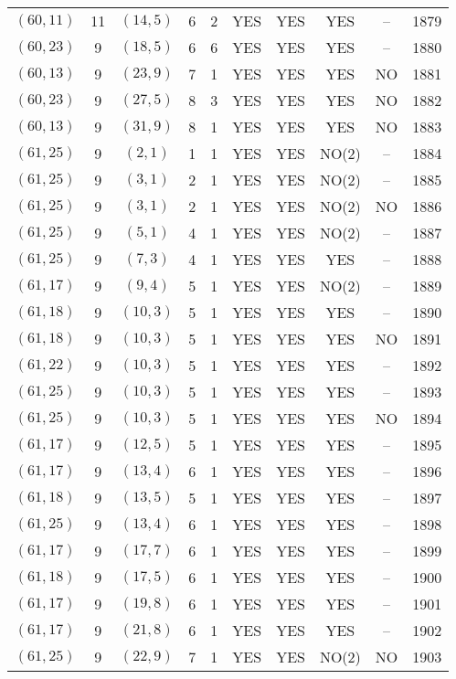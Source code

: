 \begin{longtable}{|c|c|c|c|c|c|c|c|c|c|}
$(60, 11)$ & 11 & $(14, 5)$ & 6 & 2 & YES & YES & YES & -- & 1879\\
$(60, 23)$ & 9 & $(18, 5)$ & 6 & 6 & YES & YES & YES & -- & 1880\\
$(60, 13)$ & 9 & $(23, 9)$ & 7 & 1 & YES & YES & YES & NO & 1881\\
$(60, 23)$ & 9 & $(27, 5)$ & 8 & 3 & YES & YES & YES & NO & 1882\\
$(60, 13)$ & 9 & $(31, 9)$ & 8 & 1 & YES & YES & YES & NO & 1883\\
$(61, 25)$ & 9 & $(2, 1)$ & 1 & 1 & YES & YES & NO(2) & -- & 1884\\
$(61, 25)$ & 9 & $(3, 1)$ & 2 & 1 & YES & YES & NO(2) & -- & 1885\\
$(61, 25)$ & 9 & $(3, 1)$ & 2 & 1 & YES & YES & NO(2) & NO & 1886\\
$(61, 25)$ & 9 & $(5, 1)$ & 4 & 1 & YES & YES & NO(2) & -- & 1887\\
$(61, 25)$ & 9 & $(7, 3)$ & 4 & 1 & YES & YES & YES & -- & 1888\\
$(61, 17)$ & 9 & $(9, 4)$ & 5 & 1 & YES & YES & NO(2) & -- & 1889\\
$(61, 18)$ & 9 & $(10, 3)$ & 5 & 1 & YES & YES & YES & -- & 1890\\
$(61, 18)$ & 9 & $(10, 3)$ & 5 & 1 & YES & YES & YES & NO & 1891\\
$(61, 22)$ & 9 & $(10, 3)$ & 5 & 1 & YES & YES & YES & -- & 1892\\
$(61, 25)$ & 9 & $(10, 3)$ & 5 & 1 & YES & YES & YES & -- & 1893\\
$(61, 25)$ & 9 & $(10, 3)$ & 5 & 1 & YES & YES & YES & NO & 1894\\
$(61, 17)$ & 9 & $(12, 5)$ & 5 & 1 & YES & YES & YES & -- & 1895\\
$(61, 17)$ & 9 & $(13, 4)$ & 6 & 1 & YES & YES & YES & -- & 1896\\
$(61, 18)$ & 9 & $(13, 5)$ & 5 & 1 & YES & YES & YES & -- & 1897\\
$(61, 25)$ & 9 & $(13, 4)$ & 6 & 1 & YES & YES & YES & -- & 1898\\
$(61, 17)$ & 9 & $(17, 7)$ & 6 & 1 & YES & YES & YES & -- & 1899\\
$(61, 18)$ & 9 & $(17, 5)$ & 6 & 1 & YES & YES & YES & -- & 1900\\
$(61, 17)$ & 9 & $(19, 8)$ & 6 & 1 & YES & YES & YES & -- & 1901\\
$(61, 17)$ & 9 & $(21, 8)$ & 6 & 1 & YES & YES & YES & -- & 1902\\
$(61, 25)$ & 9 & $(22, 9)$ & 7 & 1 & YES & YES & NO(2) & NO & 1903\\

\end{longtable}
